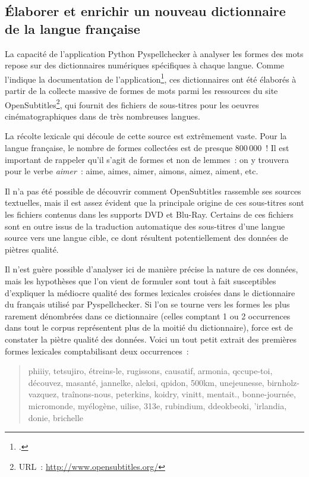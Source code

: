 \documentclass[a4paper,12pt,twoside]{book}
\begin{document}
			\subsection{Élaborer et enrichir un nouveau dictionnaire de la langue française}
				La capacité de l'application Python Pyspellchecker à analyser les formes des mots repose sur des dictionnaires numériques spécifiques à chaque langue. Comme l'indique la documentation de l'application\footcite{barrusPyspellcheckerPurePython}, ces dictionnaires ont été élaborés à partir de la collecte massive de formes de mots parmi les ressources du site OpenSubtitles\footnote{URL~: \url{http://www.opensubtitles.org/}}, qui fournit des fichiers de sous-titres pour les oeuvres cinématographiques dans de très nombreuses langues.
				
				La récolte lexicale qui découle de cette source est extrêmement vaste. Pour la langue française, le nombre de formes collectées est de presque 800\,000~! Il est important de rappeler qu'il s'agit de formes et non de lemmes~: on y trouvera pour le verbe \textit{aimer}~: aime, aimes, aimer, aimons, aimez, aiment, etc.
				
				Il n'a pas été possible de découvrir comment OpenSubtitles rassemble ses sources textuelles, mais il est assez évident que la principale origine de ces sous-titres sont les fichiers contenus dans les supports DVD et Blu-Ray. Certains de ces fichiers sont en outre issus de la traduction automatique des sous-titres d'une langue source vers une langue cible, ce dont résultent potentiellement des données de piètres qualité.
				
				Il n'est guère possible d'analyser ici de manière précise la nature de ces données, mais les hypothèses que l'on vient de formuler sont tout à fait susceptibles d'expliquer la médiocre qualité des formes lexicales croisées dans le dictionnaire du français utilisé par Pyspellchecker. Si l'on se tourne vers les formes les plus rarement dénombrées dans ce dictionnaire (celles comptant 1 ou 2 occurrences dans tout le corpus représentent plus de la moitié du dictionnaire), force est de constater la piètre qualité des données. Voici un tout petit extrait des premières formes lexicales comptabilisant deux occurrences~: 
				
				\begin{quote}
					phiiiy, tetsujiro, étreins-le, rugissons, causatif, armonia, qccupe-toi, découvez, masanté, jannelke, aleksi, qpidon, 500km, unejeunesse, birnholz-vazquez, traînons-nous, peterkins, koidry, vinitt, mentait., bonne-journée, micromonde, myélogène, uilise, 313e, rubindium, ddeokbeoki, 'irlandia, donie, brichelle
				\end{quote}
			
\end{document}
